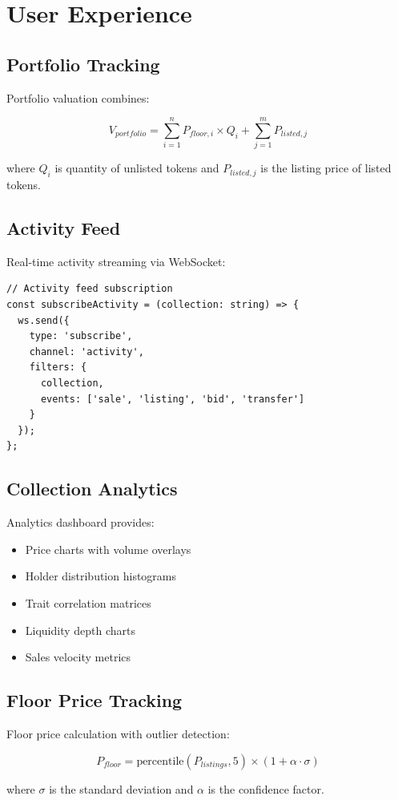 \section{User Experience}


\subsection{Portfolio Tracking}

Portfolio valuation combines:

\begin{equation}
V_{portfolio} = \sum_{i=1}^{n} P_{floor,i} \times Q_i + \sum_{j=1}^{m} P_{listed,j}
\end{equation}

where $Q_i$ is quantity of unlisted tokens and $P_{listed,j}$ is the listing price of listed tokens.

\subsection{Activity Feed}

Real-time activity streaming via WebSocket:

\begin{lstlisting}[language=Solidity]
// Activity feed subscription
const subscribeActivity = (collection: string) => {
  ws.send({
    type: 'subscribe',
    channel: 'activity',
    filters: {
      collection,
      events: ['sale', 'listing', 'bid', 'transfer']
    }
  });
};
\end{lstlisting}

\subsection{Collection Analytics}

Analytics dashboard provides:

\begin{itemize}
\item Price charts with volume overlays
\item Holder distribution histograms
\item Trait correlation matrices
\item Liquidity depth charts
\item Sales velocity metrics
\end{itemize}

\subsection{Floor Price Tracking}

Floor price calculation with outlier detection:

\begin{equation}
P_{floor} = \text{percentile}(P_{listings}, 5) \times (1 + \alpha \cdot \sigma)
\end{equation}

where $\sigma$ is the standard deviation and $\alpha$ is the confidence factor.

